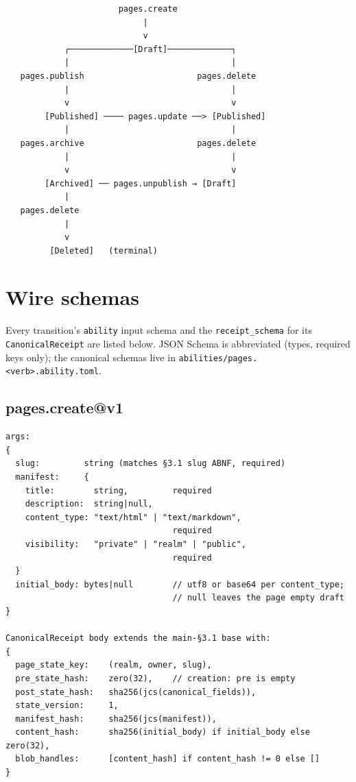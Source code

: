 \documentclass[11pt,a4paper]{article}
\theoremstyle{definition}
\begin{document}
\begin{lstlisting}
                       pages.create
                            |
                            v
            ┌─────────────[Draft]─────────────┐
            |                                 |
   pages.publish                       pages.delete
            |                                 |
            v                                 v
        [Published] ──── pages.update ──> [Published]
            |                                 |
   pages.archive                       pages.delete
            |                                 |
            v                                 v
        [Archived] ── pages.unpublish → [Draft]
            |
   pages.delete
            |
            v
         [Deleted]   (terminal)
\end{lstlisting}

\section{Wire schemas}
\label{sec:wire-schemas}

Every transition's \texttt{ability} input schema and the
\texttt{receipt\_schema} for its \texttt{CanonicalReceipt} are
listed below. JSON Schema is abbreviated (types, required keys
only); the canonical schemas live in
\texttt{abilities/pages.<verb>.ability.toml}.

\subsection{pages.create@v1}

\begin{lstlisting}
args:
{
  slug:         string (matches §3.1 slug ABNF, required)
  manifest:     {
    title:        string,         required
    description:  string|null,
    content_type: "text/html" | "text/markdown",
                                  required
    visibility:   "private" | "realm" | "public",
                                  required
  }
  initial_body: bytes|null        // utf8 or base64 per content_type;
                                  // null leaves the page empty draft
}

CanonicalReceipt body extends the main-§3.1 base with:
{
  page_state_key:    (realm, owner, slug),
  pre_state_hash:    zero(32),    // creation: pre is empty
  post_state_hash:   sha256(jcs(canonical_fields)),
  state_version:     1,
  manifest_hash:     sha256(jcs(manifest)),
  content_hash:      sha256(initial_body) if initial_body else zero(32),
  blob_handles:      [content_hash] if content_hash != 0 else []
}
\end{lstlisting}
\end{document}
